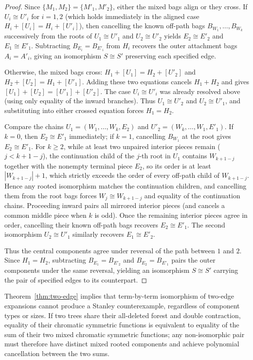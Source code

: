 \documentclass[10pt]{article}
\begin{document}
\begin{proof}
Since $\{M_1,M_2\}=\{M'_1,M'_2\}$, either the mixed bags align or they cross. If $U_i\cong U'_i$ for $i=1,2$ (which holds immediately in the aligned case $H_i+[U_i]=H_i+[U'_i]$), then cancelling the known off-path bags $B_{W_1},\ldots,B_{W_k}$ successively from the roots of $U_1\cong U'_1$ and $U_2\cong U'_2$ yields $E_2\cong E'_2$ and $E_1\cong E'_1$. Subtracting $B_{E_i}=B_{E'_i}$ from $H_i$ recovers the outer attachment bags $A_i=A'_i$, giving an isomorphism $S\cong S'$ preserving each specified edge.

Otherwise, the mixed bags cross: $H_1+[U_1]=H_2+[U'_2]$ and $H_2+[U_2]=H_1+[U'_1]$. Adding these two equations cancels $H_1+H_2$ and gives $[U_1]+[U_2]=[U'_1]+[U'_2]$. The case $U_i\cong U'_i$ was already resolved above (using only equality of the inward branches). Thus $U_1\cong U'_2$ and $U_2\cong U'_1$, and substituting into either crossed equation forces $H_1=H_2$.

Compare the chains $U_1 = (W_1,\ldots,W_k,E_2)$ and $U'_2 = (W_k,\ldots,W_1,E'_1)$. If $k=0$, then $E_2\cong E'_1$ immediately; if $k=1$, cancelling $B_{W_1}$ at the root gives $E_2\cong E'_1$. For $k\ge 2$, while at least two unpaired interior pieces remain ($j < k+1-j$), the continuation child of the $j$-th root in $U_1$ contains $W_{k+1-j}$ together with the nonempty terminal piece $E_2$, so its order is at least $|W_{k+1-j}|+1$, which strictly exceeds the order of every off-path child of $W_{k+1-j}$. Hence any rooted isomorphism matches the continuation children, and cancelling them from the root bags forces $W_j\cong W_{k+1-j}$ and equality of the continuation chains. Proceeding inward pairs all mirrored interior pieces (and cancels a common middle piece when $k$ is odd). Once the remaining interior pieces agree in order, cancelling their known off-path bags recovers $E_2\cong E'_1$. The second isomorphism $U_2\cong U'_1$ similarly recovers $E_1\cong E'_2$.

Thus the central components agree under reversal of the path between $1$ and $2$. Since $H_1=H_2$, subtracting $B_{E_1}=B_{E'_2}$ and $B_{E_2}=B_{E'_1}$ pairs the outer components under the same reversal, yielding an isomorphism $S\cong S'$ carrying the pair of specified edges to its counterpart.
\end{proof}

Theorem~\ref{thm:two-edge} implies that term-by-term isomorphism of two-edge expansions cannot produce a Stanley counterexample, regardless of component types or sizes. If two trees share their all-deleted forest and double contraction, equality of their chromatic symmetric functions is equivalent to equality of the sum of their two mixed chromatic symmetric functions; any non-isomorphic pair must therefore have distinct mixed rooted components and achieve polynomial cancellation between the two sums.
\end{document}

